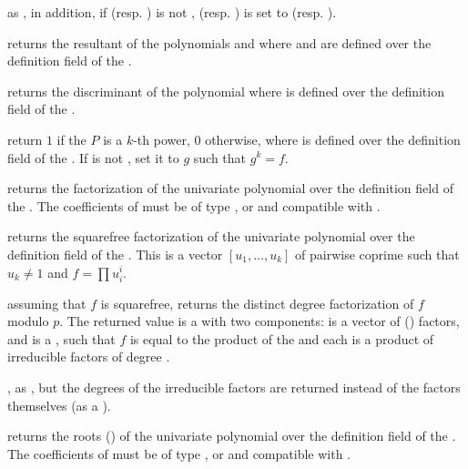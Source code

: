 as , in addition, if  (resp. ) is not
,  (resp. ) is set to  (resp. ).

 returns the resultant of the polynomials
 and  where  and  are defined over the definition
field of the  .

 returns the discriminant of the polynomial
 where  is defined over the definition field of the 
.

return $1$ if the  $P$ is a $k$-th power, $0$ otherwise,
where  is defined over the definition field of the  .
If  is not , set it to $g$ such that $g^k = f$.

 returns the factorization of the univariate
polynomial  over the definition field of the  . The
coefficients of  must be of type ,  or 
and compatible with .

 returns the squarefree
factorization of the univariate polynomial  over the definition field of
the  .  This is a vector $[u_1,\dots,u_k]$ of pairwise
coprime  such that $u_k \neq 1$ and $f = \prod u_i^i$.

 assuming that $f$ is squarefree,
returns the distinct degree factorization of $f$ modulo $p$.
The returned value  is a  with two
components:  is a vector of ()
factors, and  is a , such that
$f$ is equal to the product of the  and each 
is a product of irreducible factors of degree .

, as , but the
degrees of the irreducible factors are returned instead of the factors
themselves (as a ).

 returns the roots ()
of the univariate polynomial  over the definition field of the
 . The coefficients of  must be of type ,
 or  and compatible with .

